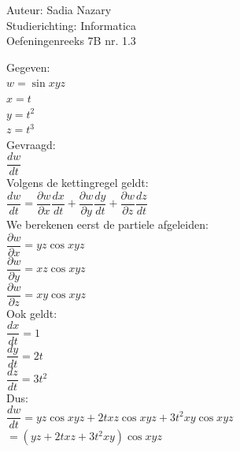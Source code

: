 \documentclass[a4paper]{article}
\begin{document}
\noindent \large Auteur: Sadia Nazary \\
\noindent \large Studierichting: Informatica\\
\noindent \large Oefeningenreeks 7B nr. 1.3\\

\medskip

\normalsize

Gegeven:\\

$w=\sin xyz$\\

$x=t$\\

$y=t^2$\\

$z=t^3$\\

Gevraagd:\\

$\dfrac{dw}{dt}$\\

Volgens de kettingregel geldt:\\

$\dfrac{dw}{dt}
=
\dfrac{\partial w}{\partial x}\dfrac{dx}{dt}
+
\dfrac{\partial w}{\partial y}\dfrac{dy}{dt}
+
\dfrac{\partial w}{\partial z}\dfrac{dz}{dt}$\\

We berekenen eerst de partiele afgeleiden:\\

$\dfrac{\partial w}{\partial x}
=
yz\cos xyz$\\

$\dfrac{\partial w}{\partial y}
=
xz\cos xyz$\\

$\dfrac{\partial w}{\partial z}
=
xy\cos xyz$\\

Ook geldt:\\

$\dfrac{dx}{dt}=1$\\

$\dfrac{dy}{dt}=2t$\\

$\dfrac{dz}{dt}=3t^2$\\

Dus:\\

$\dfrac{dw}{dt}
=
yz\cos xyz
+
2txz\cos xyz
+
3t^2xy\cos xyz$\\

$=
\left(yz+2txz+3t^2xy\right)\cos xyz$\\
\end{document}

